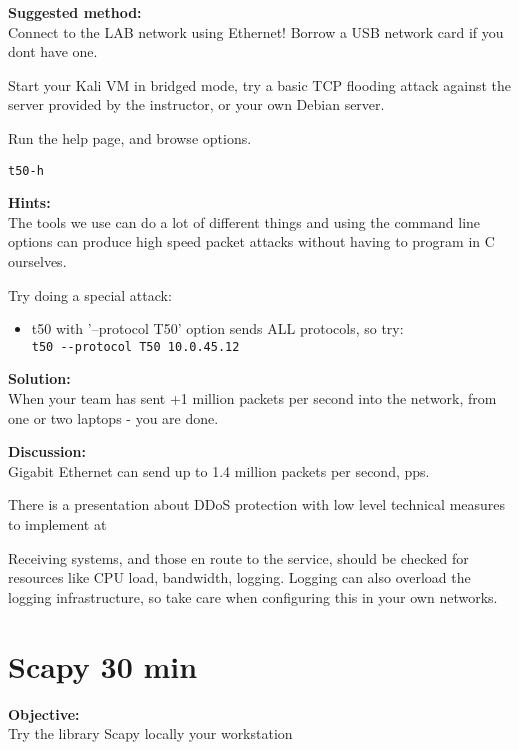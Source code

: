 \documentclass[a4paper,11pt,notitlepage]{report}
\begin{document}
{\bf Suggested method:}\\
Connect to the LAB network using Ethernet! Borrow a USB network card if you dont have one.

Start your Kali VM in bridged mode, try a basic TCP flooding attack against the server provided by the instructor, or your own Debian server.

Run the help page, and browse options.
\begin{alltt}\footnotesize
t50 -h
\end{alltt}





{\bf Hints:}\\
The tools we use can do a lot of different things and using the command line options can produce high speed packet attacks without having to program in C ourselves.

Try doing a special attack:
\begin{itemize}
\item t50 with '--protocol T50' option sends ALL protocols, so try:\\
\verb+t50 --protocol T50 10.0.45.12+
\end{itemize}


{\bf Solution:}\\
When your team has sent +1 million packets per second into the network, from one or two laptops - you are done.

{\bf Discussion:}\\
Gigabit Ethernet can send up to 1.4 million packets per second, pps.

There is a presentation about DDoS protection with low level technical measures to implement at\\
{\footnotesize {}}

Receiving systems, and those en route to the service, should be checked for resources like CPU load, bandwidth, logging. Logging can also overload the logging infrastructure, so take care when configuring this in your own networks.




\chapter{Scapy 30 min}
\label{ex:scapy}

{\bf Objective:}\\
Try the library Scapy locally your workstation
\end{document}
